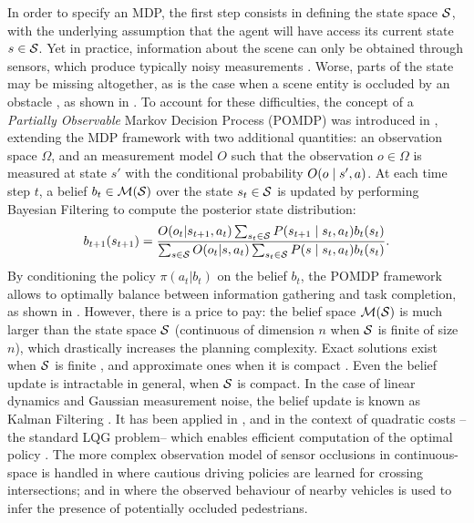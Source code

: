 In order to specify an MDP, the first step consists in defining the state space $\mathcal{S}$, with the underlying assumption that the agent will have access its current state $s\in\mathcal{S}$. Yet in practice, information about the scene can only be obtained through sensors, which produce typically noisy measurements \citep{Ulbrich2013,Du2010}. Worse, parts of the state may be missing altogether, as is the case when a scene entity is occluded by an obstacle \citep[\eg][]{Brechtel2013,Bouton2018,Sun2019}, as shown in . To account for these difficulties, the concept of a \emph{Partially Observable} Markov Decision Process (POMDP) was introduced in \citep{Astrom1965}, extending the MDP framework with two additional quantities: an observation space $\Omega$, and an measurement model $O$ such that the observation $o\in\Omega$ is measured at state $s'$ with the conditional probability $O\lparen o\mid s',a\rparen$. At each time step $t$, a belief $b_t\in\mathcal{M}(\mathcal{S})$ over the state $s_t\in \mathcal{S}$ is updated by performing Bayesian Filtering to compute the posterior state distribution:
\begin{equation*}
b_{t+1}(s_{t+1}) = \frac{O(o_t|s_{t+1}, a_t)\sum_{s_{t}\in\mathcal{S}}P\lparen s_{t+1} \mid s_t, a_t\rparen b_t(s_t)}{\sum_{s\in\mathcal{S}} O(o_t|s, a_t)\sum_{s_{t}\in\mathcal{S}}P\lparen s \mid s_t, a_t\rparen b_t(s_t)}.
\end{equation*}
By conditioning the policy $\pi(a_t|b_t)$ on the belief $b_t$, the POMDP framework allows to optimally balance between information gathering and task completion, as shown in . However, there is a price to pay: the belief space $\mathcal{M}(\mathcal{S})$ is much larger than the state space $\mathcal{S}$ (\eg continuous of dimension $n$ when $\mathcal{S}$ is finite of size $n$), which drastically increases the planning complexity. Exact solutions exist when $\mathcal{S}$ is finite \citep{Pineau2003}, and approximate ones when it is compact \citep{Porta2006,Silver2010}. Even the belief update is intractable in general, when $\mathcal{S}$ is compact. In the case of linear dynamics and Gaussian measurement noise, the belief update is known as Kalman Filtering \citep{Kalman1960}. It has been applied in \citep[\eg]{Bry2011,Bouton2017,VanDenBerg2017}, and in the context of quadratic costs --\ie the standard LQG problem-- which enables efficient computation of the optimal policy \citep[see e.g.][]{Xu2014,VanDenBerg2011}. The more complex observation model of sensor occlusions in continuous-space is handled in \citep{Brechtel2013,Brechtel2014,Bouton2018} where cautious driving policies are learned for crossing intersections; and in \citep[][]{Sun2019} where the observed behaviour of nearby vehicles is used to infer the presence of potentially occluded pedestrians.
